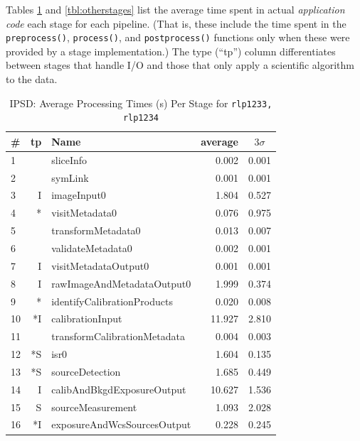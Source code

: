 Tables \ref{tbl:ipsdstages} and \ref{tbl:otherstages} list the average
time spent in actual {\it application code} each stage for each pipeline.
(That is, these include the time spent in the {\tt preprocess()}, 
{\tt process()}, and {\tt postprocess()} functions only when these
were provided by a stage implementation.)  The type (``tp'') column
differentiates between stages that handle I/O and those that only
apply a scientific algorithm to the data.  

\begin{table}[htbp]
\begin{center}
\caption{IPSD: Average Processing Times (s) Per Stage for {\tt rlp1233, rlp1234}
\label{tbl:ipsdstages}}
\small
\vspace{\baselineskip}
\begin{tabular}{lrlrr}
\hline\hline
\# & tp & Name & \multicolumn{1}{c}{average}&\multicolumn{1}{c}{$3\sigma$} \\ 
\hline
 1 &    &                     sliceInfo &  0.002 &  0.001 \\
 2 &    &                       symLink &  0.001 &  0.001 \\
 3 &  I &                   imageInput0 &  1.804 &  0.527 \\
 4 & *\phantom{I} &                visitMetadata0 &  0.076 &  0.975 \\
 5 &    &            transformMetadata0 &  0.013 &  0.007 \\
 6 &    &             validateMetadata0 &  0.002 &  0.001 \\
 7 &  I &          visitMetadataOutput0 &  0.001 &  0.001 \\
 8 &  I &    rawImageAndMetadataOutput0 &  1.999 &  0.374 \\
 9 & *\phantom{I}  &   identifyCalibrationProducts &  0.020 &  0.008 \\
10 & *I &              calibrationInput & 11.927 &  2.810 \\
11 &    &  transformCalibrationMetadata &  0.004 &  0.003 \\
12 & *S &                          isr0 &  1.604 &  0.135 \\
13 & *S &               sourceDetection &  1.685 &  0.449 \\
14 &  I &    calibAndBkgdExposureOutput & 10.627 &  1.536 \\
15 &  S &             sourceMeasurement &  1.093 &  2.028 \\
16 & *I &   exposureAndWcsSourcesOutput &  0.228 &  0.245 \\

\end{tabular}
\end{center}
\end{table}
